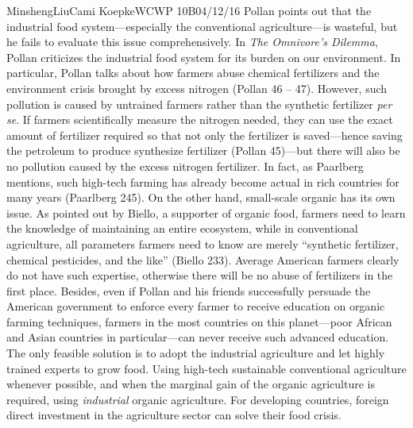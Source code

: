 \documentclass[12pt,letterpaper]{article}
\begin{document}
\begin{mla}{Minsheng}{Liu}{Cami Koepke}{WCWP 10B}{04/12/16}
Pollan points out that the industrial food system---especially the
conventional agriculture---is wasteful, but he fails to evaluate this
issue comprehensively. In \emph{The Omnivore's Dilemma}, Pollan
criticizes the industrial food system for its burden on our environment.
In particular, Pollan talks about how farmers abuse chemical fertilizers
and the environment crisis brought by excess nitrogen (Pollan 46 -- 47).
However, such pollution is caused by untrained farmers rather than the
synthetic fertilizer \emph{per se}. If farmers scientifically measure
the nitrogen needed, they can use the exact amount of fertilizer
required so that not only the fertilizer is saved---hence saving the
petroleum to produce synthesize fertilizer (Pollan 45)---but there will
also be no pollution caused by the excess nitrogen fertilizer. In fact,
as Paarlberg mentions, such high-tech farming has already become actual
in rich countries for many years (Paarlberg 245). On the other hand,
small-scale organic has its own issue. As pointed out by Biello, a
supporter of organic food, farmers need to learn the knowledge of
maintaining an entire ecosystem, while in conventional agriculture, all
parameters farmers need to know are merely ``synthetic fertilizer,
chemical pesticides, and the like'' (Biello 233). Average American
farmers clearly do not have such expertise, otherwise there will be no
abuse of fertilizers in the first place. Besides, even if Pollan and his
friends successfully persuade the American government to enforce every
farmer to receive education on organic farming techniques, farmers in
the most countries on this planet---poor African and Asian countries in
particular---can never receive such advanced education. The only
feasible solution is to adopt the industrial agriculture and let highly
trained experts to grow food. Using high-tech sustainable conventional
agriculture whenever possible, and when the marginal gain of the organic
agriculture is required, using \emph{industrial} organic agriculture.
For developing countries, foreign direct investment in the agriculture
sector can solve their food crisis.


\end{mla}
\end{document}

